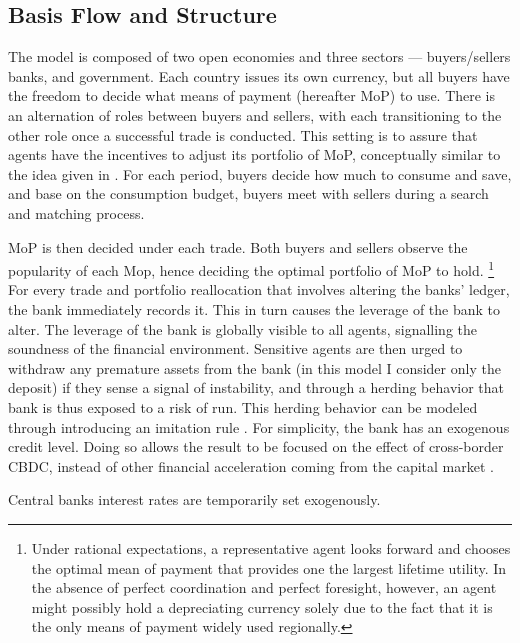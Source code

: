\subsection{Basis Flow and Structure}

The model is composed of two open economies and three sectors --- buyers/sellers
banks, and government. Each country issues its own currency, but all buyers have
the freedom to decide what means of payment (hereafter MoP) to use.  There is
an alternation of roles between buyers and sellers, with each transitioning to
the other role once a successful trade is conducted. This setting is to assure
that agents have the incentives to adjust its portfolio of MoP, conceptually
similar to the idea given in \citet*{TW95}. For each period, buyers decide how
much to consume and save, and base on the consumption budget, buyers meet with
sellers during a search and matching process.

MoP is then decided under each trade. Both buyers and sellers observe the
popularity of each Mop, hence deciding the optimal portfolio of MoP to hold.
\footnote{Under rational expectations, a representative agent looks forward and
chooses the optimal mean of payment that provides one the largest lifetime
utility. In the absence of perfect coordination and perfect foresight, however,
an agent might possibly hold a depreciating currency solely due to the fact that
it is the only means of payment widely used regionally.}
For every trade and portfolio reallocation that involves altering the banks'
ledger, the bank immediately records it. This in turn causes the leverage of the
bank to alter. The leverage of the bank is globally visible to all agents,
signalling the soundness of the financial environment. Sensitive agents are then
urged to withdraw any premature assets from the bank (in this model I consider
only the deposit) if they sense a signal of instability, and through a herding
behavior that bank is thus exposed to a risk of run. This herding behavior can be
modeled through introducing an imitation rule \citep*{Santos2021}. For
simplicity, the bank has an exogenous credit level. Doing so allows the result
to be focused on the effect of cross-border CBDC, instead of other financial
acceleration coming from the capital market \citep{BGG96}.

Central banks interest rates are temporarily set exogenously.



